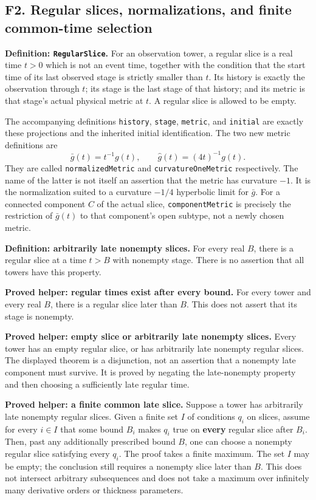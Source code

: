 \documentclass[
  letterpaper,
  11pt]{article}
\begin{document}
\subsection{F2. Regular slices, normalizations, and finite common-time
selection}\label{f2-slices}

\textbf{Definition: {\small\texttt{Regular\allowbreak{}Slice}}.} For an
observation tower, a regular slice is a real time \(t>0\) which is not
an event time, together with the condition that the start time of its
last observed stage is strictly smaller than \(t\). Its history is
exactly the observation through \(t\); its stage is the last stage of
that history; and its metric is that stage's actual physical metric at
\(t\). A regular slice is allowed to be empty.

The accompanying definitions {\small\texttt{history}},
{\small\texttt{stage}}, {\small\texttt{metric}}, and
{\small\texttt{initial}} are exactly these projections and the inherited
initial identification. The two new metric definitions are \[
 \bar g(t)=t^{-1}g(t),\qquad \widehat g(t)=(4t)^{-1}g(t).
\] They are called {\small\texttt{normalized\allowbreak{}Metric}} and
{\small\texttt{curvature\allowbreak{}One\allowbreak{}Metric}}
respectively. The name of the latter is not itself an assertion that the
metric has curvature \(-1\). It is the normalization suited to a
curvature \(-1/4\) hyperbolic limit for \(\bar g\). For a connected
component \(C\) of the actual slice,
{\small\texttt{component\allowbreak{}Metric}} is precisely the
restriction of \(\bar g(t)\) to that component's open subtype, not a
newly chosen metric.

\textbf{Definition: arbitrarily late nonempty slices.} For every real
\(B\), there is a regular slice at a time \(t>B\) with nonempty stage.
There is no assertion that all towers have this property.

\textbf{Proved helper: regular times exist after every bound.} For every
tower and every real \(B\), there is a regular slice later than \(B\).
This does not assert that its stage is nonempty.

\textbf{Proved helper: empty slice or arbitrarily late nonempty slices.}
Every tower has an empty regular slice, or has arbitrarily late nonempty
regular slices. The displayed theorem is a disjunction, not an assertion
that a nonempty late component must survive. It is proved by negating
the late-nonempty property and then choosing a sufficiently late regular
time.

\textbf{Proved helper: a finite common late slice.} Suppose a tower has
arbitrarily late nonempty regular slices. Given a finite set \(I\) of
conditions \(q_i\) on slices, assume for every \(i\in I\) that some
bound \(B_i\) makes \(q_i\) true on \textbf{every} regular slice after
\(B_i\). Then, past any additionally prescribed bound \(B\), one can
choose a nonempty regular slice satisfying every \(q_i\). The proof
takes a finite maximum. The set \(I\) may be empty; the conclusion still
requires a nonempty slice later than \(B\). This does not intersect
arbitrary subsequences and does not take a maximum over infinitely many
derivative orders or thickness parameters.
\end{document}

